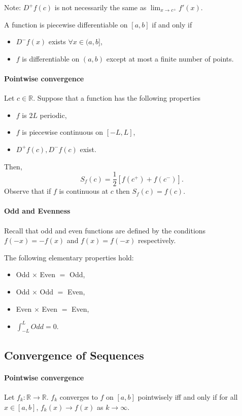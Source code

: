 Note: \(D^+ f(c)\) is not necessarily the same as \(\lim_{x\to c^+}f'(x)\).

A function is piecewise differentiable on \([a, b]\) if and only if 
\begin{itemize}
    \item \(D^-f(x)\) exists \(\forall x\in (a, b]\),
    \item \(f\) is differentiable on \((a, b)\) except at most a finite number of points.
\end{itemize}

\paragraph{Pointwise convergence}
Let \(c\in \mathbb{R}\). Suppose that a function has the following properties

\begin{itemize}
    \item \(f\) is \(2L\) periodic,
    \item \(f\) is piecewise continuous on \([-L, L]\),
    \item \(D^+f(c), D^-f(c)\) exist.
\end{itemize}

Then,
\[
S_f(c) = \frac{1}{2} [f(c^+) + f(c^-)].
\]
Observe that if \(f\) is continuous at \(c\) then \(S_f(c) = f(c)\).

\paragraph{Odd and Evenness} 
Recall that odd and even functions are defined by the conditions \(f(-x) = -f(x)\) and \(f(x) = f(-x)\) respectively.

The following elementary properties hold:
\begin{itemize}
    \item Odd \(\times\) Even \(=\) Odd,
    \item Odd \(\times\) Odd \(=\) Even,
    \item Even \(\times\) Even \(=\) Even,
    \item \(\int_{-L}^L Odd = 0\).
\end{itemize}

\subsection{Convergence of Sequences}

\paragraph{Pointwise convergence}
Let \(f_k: \mathbb{R} \to \mathbb{R}\). \(f_k\) converges to \(f\) on
\([a, b]\) pointwisely iff and only if for all \(x\in[a,b]\),
\(f_k(x)\to f(x)\) as \(k\to \infty\).

